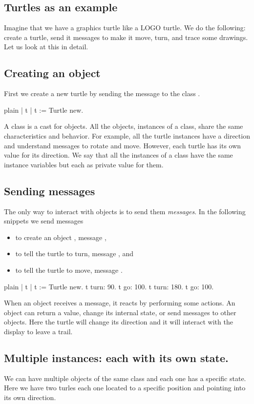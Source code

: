 \documentclass[10pt,twoside,english]{_support/latex/sbabook/sbabook}
\begin{document}
\subsection{Turtles as an example}
Imagine that we have a graphics turtle like a LOGO turtle. We do the following: create a turtle, send it messages to make it move, turn, and trace some drawings. Let us look at this in detail.
\subsection{Creating an object}
First we create a new turtle by sending the message  to the class . 

\begin{displaycode}{plain}
| t |
t := Turtle new. 
\end{displaycode}

A class is a cast for objects. All the objects, instances of a class, share the same characteristics and behavior. For example, all the turtle instances have a direction and understand messages to rotate and move. However, each turtle has its own value for its direction.
We say that all the instances of a class have the same instance variables but each as private value
for them. 
\subsection{Sending messages}
The only way to interact with objects is to send them \textit{messages}. 
In the following snippets we send messages

\begin{itemize}
\item to create an object , message ,
\item to tell the turtle to turn, message , and
\item to tell the turtle to move, message .
\end{itemize}

\begin{displaycode}{plain}
| t |
t := Turtle new. 
t turn: 90.
t go: 100.
t turn: 180. 
t go: 100.
\end{displaycode}

When an object receives a message, it reacts by performing some actions. An object can return a value, change its internal state, or send messages to other objects. Here the turtle will change its direction and it will interact with the display to leave a trail.
\subsection{Multiple instances: each with its own state. }
We can have multiple objects of the same class and each one has a specific state. Here we have two turles each one located to a specific position and pointing into its own direction. 
\end{document}
